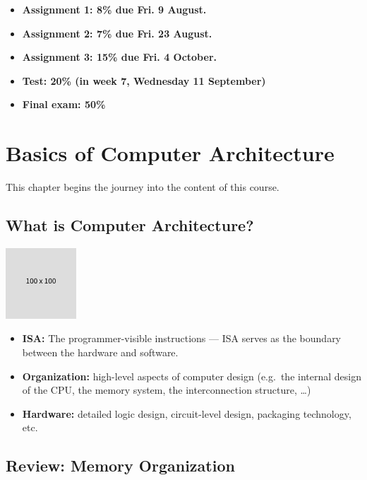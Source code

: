 \documentclass[
  14pt,
  a4paper,
  DIV=11,
  numbers=noendperiod,
  headinclude=true,
  footinclude=true]{scrreprt}
\begin{document}
\begin{itemize}
\item
  \textbf{Assignment 1: 8\% due Fri. 9 August.}
\item
  \textbf{Assignment 2: 7\% due Fri. 23 August.}
\item
  \textbf{Assignment 3: 15\% due Fri. 4 October.}
\item
  \textbf{Test: 20\% (in week 7, Wednesday 11 September)}
\item
  \textbf{Final exam: 50\%}
\end{itemize}

\chapter{Basics of Computer
Architecture}\label{basics-of-computer-architecture}

This chapter begins the journey into the content of this course.

\section{What is Computer
Architecture?}\label{what-is-computer-architecture}

\includegraphics{index_files/mediabag/FiKGhYhhIWJYiBgWIoaF.png}

\begin{itemize}
\item
  \textbf{ISA:} The programmer-visible instructions --- ISA serves as
  the boundary between the hardware and software.
\item
  \textbf{Organization:} high-level aspects of computer design (e.g.~the
  internal design of the CPU, the memory system, the interconnection
  structure, \ldots)
\item
  \textbf{Hardware:} detailed logic design, circuit-level design,
  packaging technology, etc.
\end{itemize}

\section{Review: Memory Organization}\label{review-memory-organization}
\end{document}
